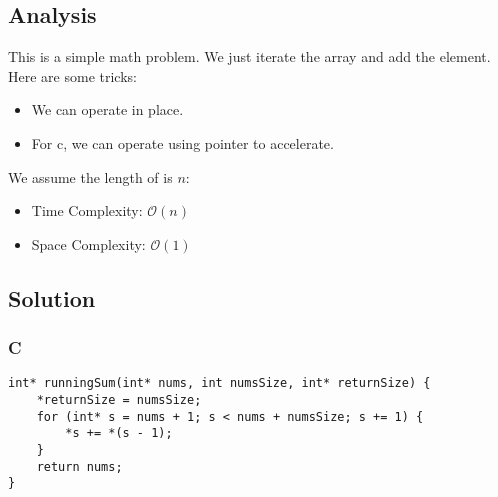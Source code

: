 \subsection*{Analysis}
This is a simple math problem. We just iterate the array and add the element. Here are some tricks:
\begin{itemize}
    \item We can operate in place.
    \item For c, we can operate using pointer to accelerate.
\end{itemize}

We assume the length of  is $n$:
\begin{itemize}
\item Time Complexity: $\mathcal{O}(n)$
\item Space Complexity: $\mathcal{O}(1)$
\end{itemize}

\subsection*{Solution}
\subsubsection*{C}
\begin{verbatim}
int* runningSum(int* nums, int numsSize, int* returnSize) {
    *returnSize = numsSize;
    for (int* s = nums + 1; s < nums + numsSize; s += 1) {
        *s += *(s - 1);
    }
    return nums;
}
\end{verbatim}

\newpage

